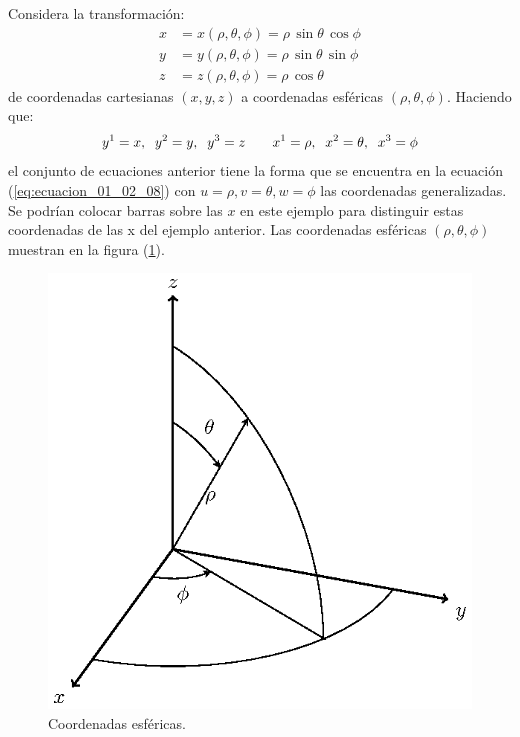 \documentclass[hidelinks,12pt]{article}
\begin{document}
Considera la transformación:
\begin{align*}
x &= x (\rho, \theta, \phi) = \rho \, \sin \theta \, \cos \phi \\[0.5em]
y &= y (\rho, \theta, \phi) = \rho \, \sin \theta \, \sin \phi \\[0.5em]
z &= z (\rho, \theta, \phi) = \rho \, \cos \theta
\end{align*}
de coordenadas cartesianas $(x, y, z)$ a coordenadas esféricas $(\rho, \theta, \phi)$. Haciendo que:
\begin{align*}
y^{1} = x, \hspace{0.2cm} y^{2} = y, \hspace{0.2cm} y^{3} = z \hspace{0.7cm} x^{1} = \rho, \hspace{0.2cm} x^{2} = \theta, \hspace{0.2cm} x^{3} = \phi
\end{align*}    
el conjunto de ecuaciones anterior tiene la forma que se encuentra en la ecuación (\ref{eq:ecuacion_01_02_08}) con $u = \rho, v = \theta, w = \phi$ las coordenadas generalizadas. Se podrían colocar barras sobre las $x$ en este ejemplo para distinguir estas coordenadas de las x del ejemplo anterior. Las coordenadas esféricas $(\rho, \theta, \phi)$ muestran en la figura (\ref{fig:figura_01_02_03}).
\begin{figure}[H]
    \centering
    \includegraphics[scale=1]{Imagenes/Sistema_Esferico.eps}
    \caption{Coordenadas esféricas.}
    \label{fig:figura_01_02_03}
\end{figure}
\end{document}
